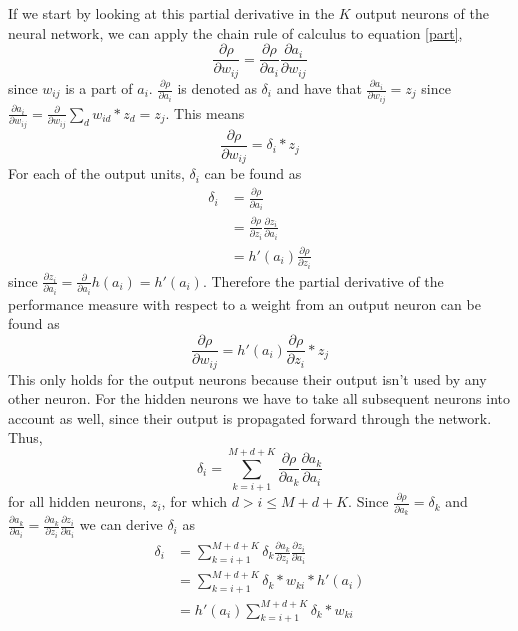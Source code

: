 \documentclass[11pt]{article}
\begin{document}
If we start by looking at this partial derivative in the $K$ output neurons of the
neural network, we can apply the chain rule of calculus to equation \ref{part},
\begin{equation}
    \frac{\partial \rho}{\partial w_{ij}} = \frac{\partial \rho}{\partial a_i} \frac{\partial a_i}{\partial w_{ij}} 
\end{equation}
since $w_{ij}$ is a part of $a_i$.
$\frac{\partial \rho}{\partial a_i}$ is denoted as $\delta_i$ and have that $\frac{\partial a_i}{\partial w_{ij}} = z_j$ since
$\frac{\partial a_i}{\partial w_{ij}} = \frac{\partial}{\partial w_{ij}} \sum_{d} w_{id} * z_d = z_j$.
This means
\begin{equation}\label{eq:der}
    \frac{\partial \rho}{\partial w_{ij}} = \delta_i * z_j  
\end{equation}
For each of the output units, $\delta_i$ can be found as
\begin{equation}
    \begin{aligned}
        \delta_i & = \frac{\partial \rho}{\partial a_i}\\
        & = \frac{\partial \rho}{\partial z_i} \frac{\partial z_i}{\partial a_i}\\
        & = h'(a_i) \frac{\partial \rho}{\partial z_i} 
    \end{aligned}
\end{equation}
since $\frac{\partial z_i}{\partial a_i} =  \frac{\partial}{\partial a_i} h(a_i) = h'(a_i)$.
Therefore the partial derivative of the performance measure with respect to a weight from
an output neuron can be found as
\begin{equation}
    \frac{\partial \rho}{\partial w_{ij}} = h'(a_i) \frac{\partial \rho}{\partial z_i} * z_j
\end{equation}
This only holds for the output neurons because their output isn't
used by any other neuron.
For the hidden neurons we have to take all subsequent neurons into account as
well, since their output is propagated forward through the network.
Thus,
\begin{equation}
    \delta_i = \sum\limits_{k=i+1}^{M + d + K} \frac{\partial \rho}{\partial a_k} \frac{\partial a_k}{\partial a_i} 
\end{equation}
for all hidden neurons, $z_i$, for which $d > i \leq M + d + K$.
Since $\frac{\partial \rho}{\partial a_k} = \delta_k$ and
$\frac{\partial a_k}{\partial a_i} = \frac{\partial a_k}{\partial z_i} \frac{\partial z_i}{\partial a_i}$ we
can derive $\delta_i$ as
\begin{equation}
    \begin{aligned}
        \delta_i & = \sum\limits_{k=i+1}^{M + d + K} \delta_k \frac{\partial a_k}{\partial z_i} \frac{\partial z_i}{\partial a_i}\\
        & = \sum\limits_{k=i+1}^{M + d + K} \delta_k * w_{ki} *  h'(a_i)\\
        & = h'(a_i) \sum\limits_{k=i+1}^{M + d + K} \delta_k * w_{ki}
    \end{aligned}
\end{equation}
\end{document}
